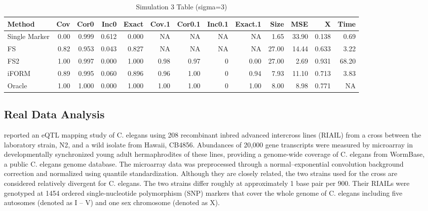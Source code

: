 \documentclass[11pt,]{book}
\theoremstyle{definition}
\theoremstyle{definition}
\theoremstyle{remark}
\begin{document}
\begin{table}

\caption{\label{tab:sim3}Simulation 3 Table (sigma=3)}
\centering
\begin{tabular}[t]{lrrrrrrrrrrrr}
\toprule
Method & Cov & Cor0 & Inc0 & Exact & Cov.1 & Cor0.1 & Inc0.1 & Exact.1 & Size & MSE & X & Time\\
\midrule
Single Marker & 0.00 & 0.999 & 0.612 & 0.000 & NA & NA & NA & NA & 1.65 & 33.90 & 0.138 & 0.69\\
FS & 0.82 & 0.953 & 0.043 & 0.827 & NA & NA & NA & NA & 27.00 & 14.44 & 0.633 & 3.22\\
FS2 & 1.00 & 0.997 & 0.000 & 1.000 & 0.98 & 0.97 & 0 & 0.00 & 27.00 & 2.69 & 0.931 & 68.20\\
iFORM & 0.89 & 0.995 & 0.060 & 0.896 & 0.96 & 1.00 & 0 & 0.94 & 7.93 & 11.10 & 0.713 & 3.83\\
Oracle & 1.00 & 1.000 & 0.000 & 1.000 & 1.00 & 1.00 & 0 & 1.00 & 8.00 & 8.98 & 0.771 & NA\\
\bottomrule
\end{tabular}
\end{table}

\subsection{Real Data Analysis}\label{real-data-analysis}

\cite{rockman2010selection} reported an eQTL mapping study of C. elegans
using 208 recombinant inbred advanced intercross lines (RIAIL) from a
cross between the laboratory strain, N2, and a wild isolate from Hawaii,
CB4856. Abundances of 20,000 gene transcripts were measured by
microarray in developmentally synchronized young adult hermaphrodites of
these lines, providing a genome-wide coverage of C. elegans from
WormBase, a public C. elegans genome database. The microarray data was
preprocessed through a normal--exponential convolution background
correction and normalized using quantile standardization. Although they
are closely related, the two strains used for the cross are considered
relatively divergent for C. elegans. The two strains differ roughly at
approximately 1 base pair per 900. Their RIAILs were genotyped at 1454
ordered single-nucleotide polymorphism (SNP) markers that cover the
whole genome of C. elegans including five autosomes (denoted as I -- V)
and one sex chromosome (denoted as X).
\end{document}
